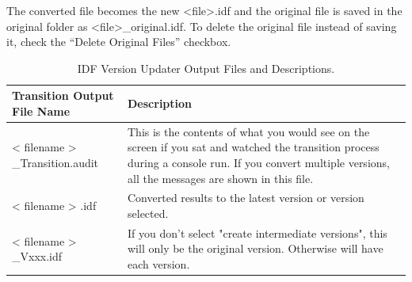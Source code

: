 The converted file becomes the new \textless{}file\textgreater{}.idf and the original file is saved in the original folder as \textless{}file\textgreater{}\_original.idf. To delete the original file instead of saving it, check the ``Delete Original Files'' checkbox.

\begin{longtable}[c]{p{1.5in}p{4.5in}}
\caption{IDF Version Updater Output Files and Descriptions. \protect \label{table:idf-version-updater-output-files}}\\
\toprule 
Transition Output File Name & Description \tabularnewline \midrule
\endhead
< filename > \_Transition.audit & This is the contents of what you would see on the screen if you sat and watched the transition process during a console run. If you convert multiple versions, all the messages are shown in this file. \tabularnewline
< filename > .idf & Converted results to the latest version or version selected. \tabularnewline
< filename > \_Vxxx.idf & If you don't select "create intermediate versions", this will only be the original version. Otherwise will have each version. \tabularnewline
\bottomrule
\end{longtable}
